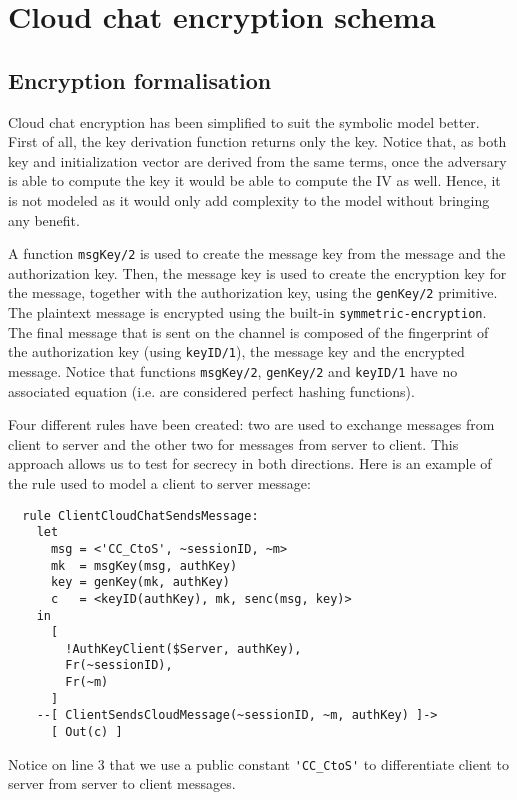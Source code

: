 \section{Cloud chat encryption schema}
\label{sec:cloud-chat-formalisation}

\subsection{Encryption formalisation}
Cloud chat encryption has been simplified to suit the symbolic model better.
First of all, the key derivation function returns only the key. Notice that, as both key and initialization vector are derived from the same terms, once the adversary is able to compute the key it would be able to compute the IV as well. Hence, it is not modeled as it would only add complexity to the model without bringing any benefit.

A function \lstinline{msgKey/2} is used to create the message key from the message and the authorization key. Then, the message key is used to create the encryption key for the message, together with the authorization key, using the \lstinline{genKey/2} primitive. The plaintext message is encrypted using the built-in \lstinline{symmetric-encryption}. The final message that is sent on the channel is composed of the fingerprint of the authorization key (using \lstinline{keyID/1}), the message key and the encrypted message. Notice that functions \lstinline{msgKey/2}, \lstinline{genKey/2} and \lstinline{keyID/1} have no associated equation (i.e. are considered perfect hashing functions).

Four different rules have been created: two are used to exchange messages from client to server and the other two for messages from server to client. This approach allows us to test for secrecy in both directions. Here is an example of the rule used to model a client to server message:

\begin{lstlisting}
  rule ClientCloudChatSendsMessage:
    let
      msg = <'CC_CtoS', ~sessionID, ~m>
      mk  = msgKey(msg, authKey)
      key = genKey(mk, authKey)
      c   = <keyID(authKey), mk, senc(msg, key)>
    in
      [
        !AuthKeyClient($Server, authKey),
        Fr(~sessionID),
        Fr(~m)
      ]
    --[ ClientSendsCloudMessage(~sessionID, ~m, authKey) ]->
      [ Out(c) ]
\end{lstlisting}

Notice on line 3 that we use a public constant \lstinline{'CC_CtoS'} to differentiate client to server from server to client messages.

